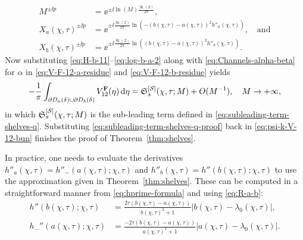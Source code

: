 \begin{align}
M^{\pm \ii p} &= \ee^{\pm \ii \ln(M) \frac{\ln(2)}{2\pi}},\\
X_a(\chi,\tau)^{\pm \ii p} &= \ee^{\pm \ii \frac{\ln(2)}{2\pi} \ln\left( - (b(\chi,\tau) - a(\chi,\tau) )^2h''_a(\chi,\tau) \right)},\quad\text{and}
\label{eq:log-b-a-1}\\
X_b(\chi,\tau)^{\pm \ii p} &= \ee^{\pm \ii \frac{\ln(2)}{2\pi} \ln\left( (b(\chi,\tau) - a(\chi,\tau) )^2h''_b(\chi,\tau) \right)}.
\label{eq:log-b-a-2}
\end{align}
Now substituting \eqref{eq:H-b-11}--\eqref{eq:log-b-a-2} along with \eqref{eq:Channels-alpha-beta} for $\alpha$ in \eqref{eq:V-F-12-a-residue} and \eqref{eq:V-F-12-b-residue} yields
\begin{equation}
- \frac{1}{\pi}\int_{\partial D_{a}(\delta) \cup \partial D_{b}(\delta)} V^{\mathbf{F}}_{12}(\eta)\,\mathrm{d} \eta  = \mathfrak{S}^{[\mathcal{S}]}_s(\chi,\tau;M) + O(M^{-1}), \quad M\to+\infty,
\label{eq:subleading-term-shelves-q-proof}
\end{equation}
in which $\mathfrak{S}_s^{[\mathcal{S}]}(\chi,\tau;M)$ is the sub-leading term defined in \eqref{eq:subleading-term-shelves-q}. Substituting \eqref{eq:subleading-term-shelves-q-proof} back in \eqref{eq:psi-k-V-12-bun} 
finishes the proof of Theorem~\ref{thm:shelves}. 
\begin{remark} In practice, one needs to evaluate the derivatives $h''_a(\chi,\tau)=h''_-(a(\chi,\tau);\chi,\tau)$ and $h''_b(\chi,\tau)=h''(b(\chi,\tau);\chi,\tau)$ to 
use the approximation given in Theorem~\ref{thm:shelves}. These can be computed in a straightforward manner from \eqref{eq:hprime-formula} and using \eqref{eq:R-a-b}:
\begin{align}
{h}''(b(\chi,\tau);\chi,\tau) &= \frac{2\tau(b(\chi,\tau) - a(\chi,\tau))}{b(\chi,\tau)^2+1}|b(\chi,\tau) - \lambda_0(\chi,\tau)|, \label{eq:h-double-prime-b} \\
{h}_{-}''(a(\chi,\tau);\chi,\tau) &= \frac{- 2\tau(b(\chi,\tau) - a(\chi,\tau))}{a(\chi,\tau)^2+1} | a(\chi,\tau) - \lambda_0(\chi,\tau)|.
\label{eq:h-double-prime-a}
\end{align}
\label{rem:h-double-prime}
\end{remark}

